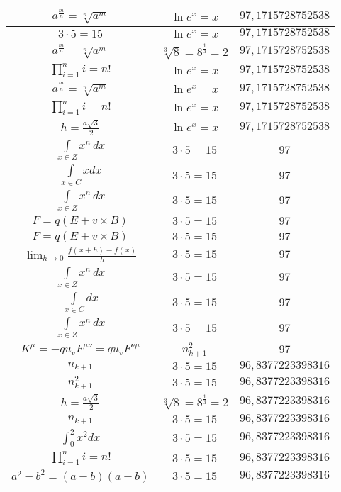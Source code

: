 \documentclass{article}
\begin{document}
\begin{flushleft}
\begin{longtable}{|c|c|c|}
$a^{\frac{m}{n}}=\sqrt[n]{a^{m}}$ & $\ln e^x=x$ & $97,1715728752538$ \\ \hline 
$3\cdot 5=15$ & $\ln e^x=x$ & $97,1715728752538$ \\ \hline 
$a^{\frac{m}{n}}=\sqrt[n]{a^{m}}$ & $\sqrt[3]{8}=8^{\frac{1}{3}}=2$ & $97,1715728752538$ \\ \hline 
$\prod_{i=1}^ni=n!$ & $\ln e^x=x$ & $97,1715728752538$ \\ \hline 
$a^{\frac{m}{n}}=\sqrt[n]{a^{m}}$ & $\ln e^x=x$ & $97,1715728752538$ \\ \hline 
$\prod_{i=1}^ni=n!$ & $\ln e^x=x$ & $97,1715728752538$ \\ \hline 
$h=\frac{a\sqrt{3}}{2}$ & $\ln e^x=x$ & $97,1715728752538$ \\ \hline 
$\int \limits_{x\in Z}\!x^{n}\,dx$ & $3\cdot 5=15$ & $97$ \\ \hline 
$\int \limits_{x\in C}xdx$ & $3\cdot 5=15$ & $97$ \\ \hline 
$\int \limits_{x\in Z}\!x^{n}\,dx$ & $3\cdot 5=15$ & $97$ \\ \hline 
$F=q\left(E+v\times B\right)$ & $3\cdot 5=15$ & $97$ \\ \hline 
$F=q\left(E+v\times B\right)$ & $3\cdot 5=15$ & $97$ \\ \hline 
$\lim_{h\to0}\frac{f(x+h)-f(x)}{h}$ & $3\cdot 5=15$ & $97$ \\ \hline 
$\int \limits_{x\in Z}\!x^{n}\,dx$ & $3\cdot 5=15$ & $97$ \\ \hline 
$\int \limits_{x\in C}dx$ & $3\cdot 5=15$ & $97$ \\ \hline 
$\int \limits_{x\in Z}\!x^{n}\,dx$ & $3\cdot 5=15$ & $97$ \\ \hline 
$K^\mu=-qu_vF^{\mu\nu}=qu_vF^{\nu\mu}$ & $n_{k+1}^2$ & $97$ \\ \hline 
$n_{k+1}$ & $3\cdot 5=15$ & $96,8377223398316$ \\ \hline 
$n_{k+1}^2$ & $3\cdot 5=15$ & $96,8377223398316$ \\ \hline 
$h=\frac{a\sqrt{3}}{2}$ & $\sqrt[3]{8}=8^{\frac{1}{3}}=2$ & $96,8377223398316$ \\ \hline 
$n_{k+1}$ & $3\cdot 5=15$ & $96,8377223398316$ \\ \hline 
$\int _0^2x^2dx$ & $3\cdot 5=15$ & $96,8377223398316$ \\ \hline 
$\prod_{i=1}^ni=n!$ & $3\cdot 5=15$ & $96,8377223398316$ \\ \hline 
$a^2-b^2=(a-b)(a+b)$ & $3\cdot 5=15$ & $96,8377223398316$ \\ \hline 

\end{longtable}
\end{flushleft}
\end{document}
